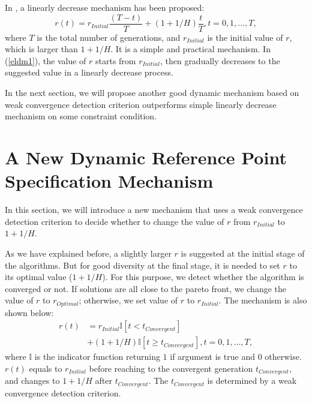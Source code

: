 \documentclass[conference]{IEEEtran}
\begin{document}
In \cite{hisao:dynamic}, a linearly decrease mechanism has been proposed:
\begin{equation}\label{eldm1}
  r(t)=r_{Initial}\frac{(T-t)}{T}+(1+1/H)\frac{t}{T}, t=0,1,\dots,T,
\end{equation}
where $T$ is the total number of generations, and $r_{Initial}$ is the initial value of $r$,
which is larger than $1+1/H$.
It is a simple and practical mechanism. In (\ref{eldm1}), the value of $r$ starts from $r_{Initial}$,
then gradually decreases to the suggested value in a linearly decrease process. 

In the next section, we will propose another good dynamic mechanism based on weak convergence 
detection criterion outperforms simple linearly decrease mechanism on some constraint condition.

% 
\section{A New Dynamic Reference Point Specification Mechanism}
In this section,
we will introduce a new mechanism that uses a weak convergence detection criterion to 
decide whether to change the value of $r$ from $r_{Initial}$ to $1+1/H$. 

As we have explained before, 
a slightly larger $r$ is suggested at the initial stage of the algorithms. 
But for good diversity at the final stage,
it is needed to set $r$ to its optimal value ($1+1/H$). 
For this purpose, we detect whether the algorithm is converged or not.  
If solutions are all close to the pareto front, 
we change the value of $r$ to $r_{Optimal}$; otherwise, we set value of $r$ to 
$r_{Initial}$. The mechanism is also shown below:
\begin{equation}\begin{aligned}\label{endm1}
  r(t)&=r_{Initial}\mathbb{I}\left[t<t_{Convergent}\right]\\
  &+(1+1/H)\mathbb{I}\left[t \ge t_{Convergent}\right], t=0,1,\dots,T,
\end{aligned}
\end{equation}
where $\mathbb{I}$ is the indicator function returning $1$ if argument is true and $0$ otherwise.
$r(t)$ equals to $r_{Initial}$ before reaching to the convergent generation $t_{Convergent}$,
and changes to $1+1/H$ after $t_{Convergent}$. 
The $t_{Convergent}$ is determined by a weak convergence detection criterion. 
\end{document}
